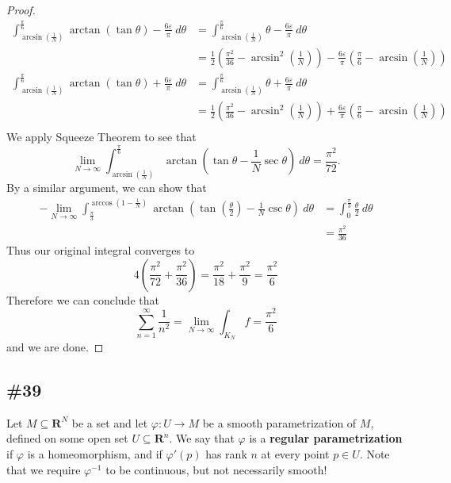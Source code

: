 \documentclass{article}
\newcommand{\R}{\mathbf{R}}
\theoremstyle{plain} %
\numberwithin{thm}{section} %
\theoremstyle{definition}
\begin{document}
\begin{proof}
    \begin{align*}
        \int _{\arcsin \left( \frac{1}{N} \right)}^{\frac{\pi}{6}} \arctan (\tan \theta) - \frac{6\varepsilon}{\pi}\ d \theta &= \int _{\arcsin \left( \frac{1}{N} \right)}^{\frac{\pi}{6}} \theta - \frac{6\varepsilon}{\pi}\ d \theta \\
        &= \frac{1}{2}\left( \frac{\pi^2}{36} - \arcsin ^2\left( \frac{1}{N} \right)  \right) - \frac{6\varepsilon}{\pi}\left( \frac{\pi}{6} - \arcsin \left( \frac{1}{N}\right)\right) \\
        \int _{\arcsin \left( \frac{1}{N} \right)}^{\frac{\pi}{6}} \arctan (\tan \theta) + \frac{6\varepsilon}{\pi}\ d \theta &= \int _{\arcsin \left( \frac{1}{N} \right)}^{\frac{\pi}{6}} \theta + \frac{6\varepsilon}{\pi}\ d \theta \\
        &= \frac{1}{2}\left( \frac{\pi^2}{36} - \arcsin ^2\left( \frac{1}{N} \right)  \right) + \frac{6\varepsilon}{\pi}\left( \frac{\pi}{6} - \arcsin \left( \frac{1}{N}\right)\right) \\
    \end{align*}
    We apply Squeeze Theorem to see that
    \[
        \lim_{N \to \infty} \int _{\arcsin \left( \frac{1}{N} \right)}^{\frac{\pi}{6}} \arctan \left( \tan \theta - \frac{1}{N}\sec \theta \right) \ d \theta = \frac{\pi^2}{72}.
    \]
    By a similar argument, we can show that
    \begin{align*}
        -\lim_{N \to \infty} \int _{\frac{\pi}{3}}^{\arccos \left( 1-\frac{1}{N} \right)} \arctan \left( \tan \left( \frac{\theta}{2} \right) - \frac{1}{N}\csc \theta \right)\ d \theta &= \int_0^{\frac{\pi}{3}} \frac{\theta}{2}\ d \theta \\
        &= \frac{\pi^2}{36}
    \end{align*}
    Thus our original integral converges to
    \[
        4\left( \frac{\pi^2}{72} + \frac{\pi^2}{36}\right) = \frac{\pi^2}{18} + \frac{\pi^2}{9} = \frac{\pi^2}{6}
    \]
    Therefore we can conclude that
    \[
        \sum_{n=1}^{\infty} \frac{1}{n^2} = \lim_{N \to \infty} \int _{K_N} f = \frac{\pi^2}{6}
    \]
    and we are done.
        \end{proof}
        \newpage
        \subsection{\#39}
        Let $M\subseteq\R^N$ be a set and let $\varphi:U\rightarrow M$ be a smooth parametrization of $M$, defined on some open set $U\subseteq \R^n$. We say that $\varphi$ is a \textbf{regular parametrization} if $\varphi$ is a homeomorphism, and if $\varphi'(p)$ has rank $n$ at every point $p\in U$. Note that we require $\varphi^{-1}$ to be continuous, but not necessarily smooth!
\end{document}

